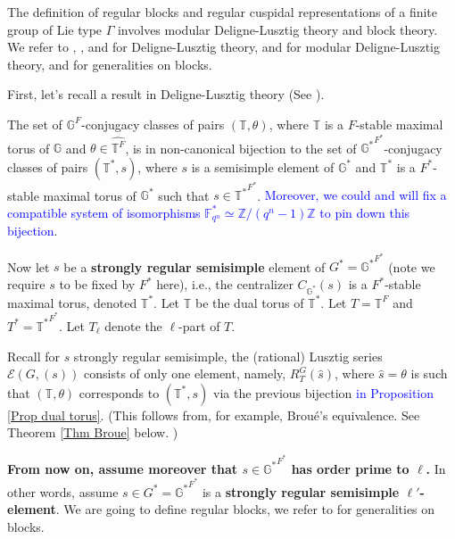 	The definition of regular blocks and regular cuspidal representations of a finite group of Lie type $\Gamma$ involves modular Deligne-Lusztig theory and block theory. We refer to \cite{deligne1976representations}, \cite{carter1985finite}, and \cite{digne2020representations} for Deligne-Lusztig theory, \cite{michel1989bloc} and \cite{broue1990isometries} for modular Deligne-Lusztig theory, and \cite[Appendix B]{bonnafe2010representations} for generalities on blocks. 
	
	First, let's recall a result in Deligne-Lusztig theory (See \cite[Proposition 11.1.5]{digne2020representations}). 
	
	\begin{proposition}\label{Prop dual torus}
		The set of $\mathbb{G}^F$-conjugacy classes of pairs $(\mathbb{T}, \theta)$, where  $\mathbb{T}$ is a $F$-stable maximal torus of  $\mathbb{G}$ and $\theta \in \widehat{\mathbb{T}^F}$, is in non-canonical bijection to the set of $\mathbb{G^*}^{F^*}$-conjugacy classes of pairs $(\mathbb{T}^*, s)$, where $s$ is a semisimple element of $\mathbb{G}^*$ and $\mathbb{T}^*$ is a $F^*$-stable maximal torus of $\mathbb{G}^*$ such that $s \in {\mathbb{T}^*}^{F^*}$.  \textcolor{blue}{Moreover, we could and will fix a compatible system of isomorphisms $\mathbb{F}_{q^n}^* \simeq \mathbb{Z}/(q^n-1)\mathbb{Z}$ to pin down this bijection}.
	\end{proposition}
	
	Now let $s$ be a \textbf{strongly regular semisimple} 
	element of $G^*={\mathbb{G}^*}^{F^*}$ (note we require $s$ to be fixed by $F^*$ here), i.e., the centralizer $C_{\mathbb{G}^*}(s)$ is a $F^*$-stable maximal torus, denoted $\mathbb{T}^*$. Let $\mathbb{T}$ be the dual torus of $\mathbb{T}^*$. Let $T=\mathbb{T}^F$ and $T^*={\mathbb{T}^*}^{F^*}$. Let $T_\ell$ denote the $\ell$-part of $T$.
	
	Recall for $s$ strongly regular semisimple, the (rational) Lusztig series $\mathcal{E}(G, (s))$ consists of only one element, namely, $R_T^G(\hat{s})$, where $\hat{s}=\theta$ is such that $(\mathbb{T}, \theta)$ corresponds to $(\mathbb{T}^*, s)$ via the previous bijection \textcolor{blue}{in Proposition \ref{Prop dual torus}}. (This follows from, for example, Broué's equivalence. See Theorem \ref{Thm Broue} below.
	)
	
	\textbf{From now on, assume moreover that $s \in {\mathbb{G}^*}^{F^*}$ has order prime to $\ell$.} In other words, assume $s \in G^*={\mathbb{G}^*}^{F^*}$ is a \textbf{strongly regular semisimple $\ell'$-element}. We are going to define regular blocks, we refer to \cite[Appendix B]{bonnafe2010representations} for generalities on blocks.
	
